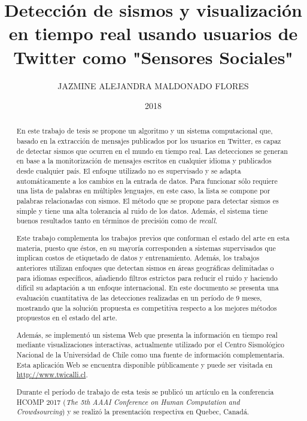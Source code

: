\documentclass[upright, contnum]{umemoria}
\author{JAZMINE ALEJANDRA MALDONADO FLORES}
\title{Detección de sismos y visualización en tiempo real usando usuarios de Twitter como "Sensores Sociales"}
\date{2018}
\begin{document}
\frontmatter
\maketitle

\begin{abstract}

En este trabajo de tesis se propone un algoritmo y un sistema computacional que, basado en la extracción de mensajes publicados por los usuarios en Twitter, es capaz de detectar sismos que ocurren en el mundo en tiempo real. Las detecciones se generan en base a la monitorización de mensajes escritos en cualquier idioma y publicados desde cualquier país. El enfoque utilizado no es supervisado y se adapta automáticamente a los cambios en la entrada de datos. Para funcionar sólo requiere una lista de palabras en múltiples lenguajes, en este caso, la lista se compone por palabras relacionadas con sismos. 
El método que se propone para detectar sismos es simple y tiene una alta tolerancia al ruido de los datos.  Además, el sistema tiene buenos resultados tanto en términos de precisión como de \textit{recall}. 

Este trabajo complementa los trabajos previos que conforman el estado del arte en esta materia, puesto que éstos, en su mayoría corresponden a sistemas supervisados que implican costos de etiquetado de datos y entrenamiento. Además, los trabajos anteriores utilizan enfoques que detectan sismos en áreas geográficas delimitadas o para idiomas específicos, añadiendo filtros estrictos para reducir el ruido y haciendo difícil su adaptación a un enfoque internacional. En este documento se presenta una evaluación cuantitativa de las detecciones realizadas en un período de 9 meses, mostrando que la solución propuesta es competitiva respecto a los mejores métodos propuestos en el estado del arte. 

Además, se implementó un sistema Web que presenta la información en tiempo real mediante visualizaciones interactivas, actualmente utilizado por el Centro Sismológico Nacional de la Universidad de Chile como una fuente de información complementaria. Esta aplicación Web se encuentra disponible públicamente y puede ser visitada en \url{http://www.twicalli.cl}.

Durante el período de trabajo de esta tesis se publicó un artículo en la conferencia HCOMP 2017 (\textit{The 5th AAAI Conference on Human Computation and Crowdsourcing}) y se realizó la presentación respectiva en Quebec, Canadá.  

\end{abstract}
\end{document}
